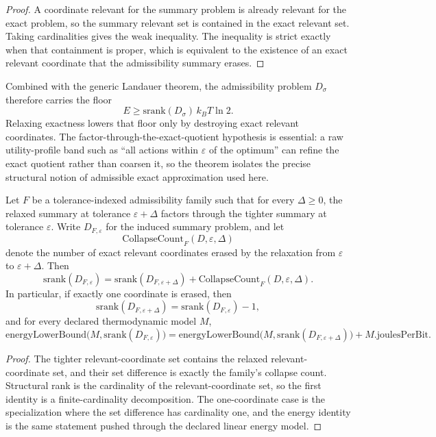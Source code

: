 \begin{proof}
A coordinate relevant for the summary problem is already relevant for the exact problem, so the summary relevant set is contained in the exact relevant set. Taking cardinalities gives the weak inequality. The inequality is strict exactly when that containment is proper, which is equivalent to the existence of an exact relevant coordinate that the admissibility summary erases.
\end{proof}

Combined with the generic Landauer theorem, the admissibility problem $D_\sigma$ therefore carries the floor
\[
E \ge \mathrm{srank}(D_\sigma)\,k_B T\ln 2.
\]
Relaxing exactness lowers that floor only by destroying exact relevant coordinates. The factor-through-the-exact-quotient hypothesis is essential: a raw utility-profile band such as ``all actions within $\varepsilon$ of the optimum'' can refine the exact quotient rather than coarsen it, so the theorem isolates the precise structural notion of admissible exact approximation used here.

\begin{theorem}\label{thm:quantitative-admissibility-rank-collapse}
Let $F$ be a tolerance-indexed admissibility family such that for every $\Delta \ge 0$, the relaxed summary at tolerance $\varepsilon+\Delta$ factors through the tighter summary at tolerance $\varepsilon$. Write $D_{F,\varepsilon}$ for the induced summary problem, and let
\[
\mathrm{CollapseCount}_F(D,\varepsilon,\Delta)
\]
denote the number of exact relevant coordinates erased by the relaxation from $\varepsilon$ to $\varepsilon+\Delta$. Then
\[
\mathrm{srank}(D_{F,\varepsilon})
=
\mathrm{srank}(D_{F,\varepsilon+\Delta})
+
\mathrm{CollapseCount}_F(D,\varepsilon,\Delta).
\]
In particular, if exactly one coordinate is erased, then
\[
\mathrm{srank}(D_{F,\varepsilon+\Delta})
=
\mathrm{srank}(D_{F,\varepsilon})-1,
\]
and for every declared thermodynamic model $M$,
\[
\mathrm{energyLowerBound}\bigl(M,\mathrm{srank}(D_{F,\varepsilon})\bigr)
=
\mathrm{energyLowerBound}\bigl(M,\mathrm{srank}(D_{F,\varepsilon+\Delta})\bigr)
+ M.\mathrm{joulesPerBit}.
\]
\end{theorem}

\begin{proof}
The tighter relevant-coordinate set contains the relaxed relevant-coordinate set, and their set difference is exactly the family's collapse count. Structural rank is the cardinality of the relevant-coordinate set, so the first identity is a finite-cardinality decomposition. The one-coordinate case is the specialization where the set difference has cardinality one, and the energy identity is the same statement pushed through the declared linear energy model.
\end{proof}

